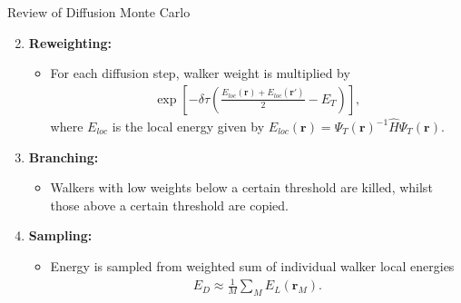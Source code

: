 \documentclass{beamer}
\begin{document}
\begin{frame}{Review of Diffusion Monte Carlo}
  \begin{enumerate}
  \setcounter{enumi}{1}
    \item \textbf{Reweighting:} 
      \begin{itemize}
      \item For each diffusion step, walker weight is multiplied by
    \small{\begin{align}
    \label{ReweightWalker}
 \exp \left[ -\delta \tau \left( \frac{ E_{loc}(\mathbf{r}) + E_{loc}(\mathbf{r}') }{2} - E_T \right) \right], 
    \end{align}}%
    where $E_{loc}$ is the local energy given by $ E_{loc}(\mathbf{r}) = \Psi_T (\mathbf{r})^{-1} \hat H \Psi_T (\mathbf{r})$.%
     \end{itemize}
     \item{\textbf{Branching:}
     \begin{itemize}
       \item Walkers with low weights below a certain threshold are killed, whilst those above a certain threshold are copied.
     \end{itemize}
     }
  \item \textbf{Sampling:} 
   \begin{itemize}
       \item Energy is sampled from weighted sum of individual walker local energies
       \small{\begin{align}
       \label{LocalEnergySampling}
 E_{D} \approx \frac{1}{M} \sum_M E_L (\mathbf{r}_M).
    \end{align}}%
     \end{itemize}
  \end{enumerate}
\end{frame}
\end{document}
